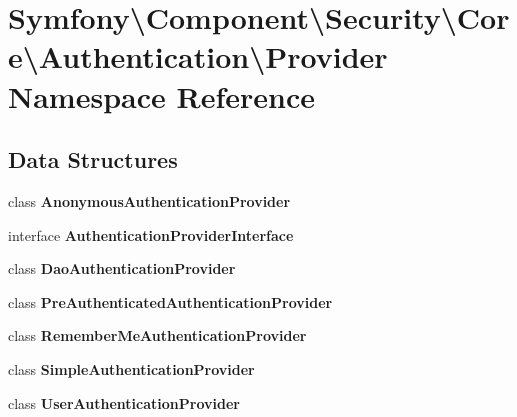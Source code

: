 \section{Symfony\textbackslash{}Component\textbackslash{}Security\textbackslash{}Core\textbackslash{}Authentication\textbackslash{}Provider Namespace Reference}
\label{namespace_symfony_1_1_component_1_1_security_1_1_core_1_1_authentication_1_1_provider}
\subsection*{Data Structures}
\begin{DoxyCompactItemize}
\item 
class {\bf Anonymous\+Authentication\+Provider}
\item 
interface {\bf Authentication\+Provider\+Interface}
\item 
class {\bf Dao\+Authentication\+Provider}
\item 
class {\bf Pre\+Authenticated\+Authentication\+Provider}
\item 
class {\bf Remember\+Me\+Authentication\+Provider}
\item 
class {\bf Simple\+Authentication\+Provider}
\item 
class {\bf User\+Authentication\+Provider}
\end{DoxyCompactItemize}
